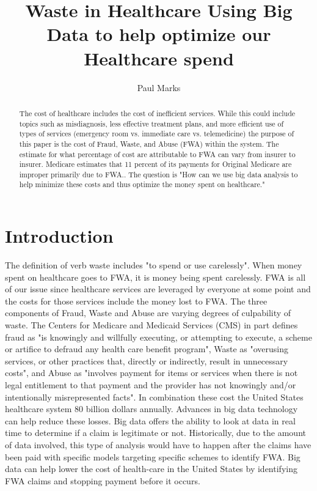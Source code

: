 \documentclass[sigconf]{acmart}
\begin{document}
\title{Waste in Healthcare
Using Big Data to help optimize our Healthcare spend}


\author{Paul Marks}


\begin{abstract}
The cost of healthcare includes the cost of inefficient services.  While this could include topics such as misdiagnosis, less effective treatment plans, and more efficient use of types of services (emergency room vs. immediate care vs. telemedicine) the purpose of this paper is the cost of Fraud, Waste, and Abuse (FWA) within the system.  The estimate for what percentage of cost are attributable to FWA can vary from insurer to insurer.  Medicare estimates that 11 percent of its payments for Original Medicare are improper primarily due to FWA.\cite{FY2016HHSFR}.   The question is "How can we use big data analysis to help minimize these costs and thus optimize the money spent on healthcare."
\end{abstract}



\maketitle

\section{Introduction}

The definition of verb waste includes "to spend or use carelessly"\cite{WasteDef}.  When money spent on healthcare goes to FWA, it is money being spent carelessly.  FWA is all of our issue since healthcare services are leveraged by everyone at some point and the costs for those services include the money lost to FWA.  The three components of Fraud, Waste and Abuse are varying degrees of culpability of waste.  The Centers for Medicare and Medicaid Services (CMS) in part defines fraud as "is knowingly and willfully executing, or attempting to execute, a scheme or artifice to defraud any health care benefit program", Waste as "overusing services, or other practices that, directly or indirectly, result in unnecessary costs", and Abuse as "involves payment for items or services when there is not legal entitlement to that payment and the provider has not knowingly and/or intentionally misrepresented facts"\cite{MLNFWA}.  In combination these cost the United States healthcare system 80 billion dollars\cite{HFMA} annually.  
Advances in big data technology can help reduce these losses.  Big data offers the ability to look at data in real time to determine if a claim is legitimate or not.  Historically, due to the amount of data involved, this type of analysis would have to happen after the claims have been paid with specific models targeting specific schemes to identify FWA.  Big data can help lower the cost of health-care in the United States by identifying FWA claims and stopping payment before it occurs. 
\end{document}
